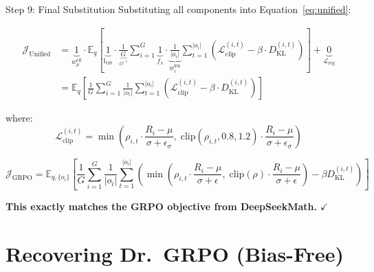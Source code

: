 \documentclass[11pt,a4paper]{article}
\begin{document}
\begin{proofbox}{Step 9: Final Substitution}
Substituting all components into Equation~\eqref{eq:unified}:

\begin{align}
\mathcal{J}_{\text{Unified}} &= \underbrace{1}_{w_\mu^{\text{eff}}} \cdot \mathbb{E}_{q} \left[ \underbrace{1}_{\mathbb{I}_{\text{OS}}} \cdot \frac{1}{\underbrace{G}_{\Omega^{-1}}} \sum_{i=1}^{G} \underbrace{1}_{f_\lambda} \cdot \underbrace{\frac{1}{|o_i|}}_{w_i^{\text{len}}} \sum_{t=1}^{|o_i|} \left( \mathcal{L}_{\text{clip}}^{(i,t)} - \beta \cdot D_{\text{KL}}^{(i,t)} \right) \right] + \underbrace{0}_{\mathcal{L}_{\text{reg}}} \\[10pt]
&= \mathbb{E}_{q} \left[ \frac{1}{G} \sum_{i=1}^{G} \frac{1}{|o_i|} \sum_{t=1}^{|o_i|} \left( \mathcal{L}_{\text{clip}}^{(i,t)} - \beta \cdot D_{\text{KL}}^{(i,t)} \right) \right]
\end{align}

where:
\begin{equation}
\mathcal{L}_{\text{clip}}^{(i,t)} = \min\left( \rho_{i,t} \cdot \frac{R_i - \mu}{\sigma + \epsilon_\sigma}, \; \text{clip}(\rho_{i,t}, 0.8, 1.2) \cdot \frac{R_i - \mu}{\sigma + \epsilon_\sigma} \right)
\end{equation}
\end{proofbox}

\begin{resultbox}
\begin{equation}
\mathcal{J}_{\text{GRPO}} = \mathbb{E}_{q, \{o_i\}} \left[ \frac{1}{G} \sum_{i=1}^{G} \frac{1}{|o_i|} \sum_{t=1}^{|o_i|} \left( \min\left( \rho_{i,t} \cdot \frac{R_i - \mu}{\sigma + \epsilon}, \; \text{clip}(\rho) \cdot \frac{R_i - \mu}{\sigma + \epsilon} \right) - \beta D_{\text{KL}}^{(i,t)} \right) \right]
\end{equation}

\textbf{This exactly matches the GRPO objective from DeepSeekMath.} $\checkmark$
\end{resultbox}

\newpage

\section{Recovering Dr.~GRPO (Bias-Free)}
\end{document}
